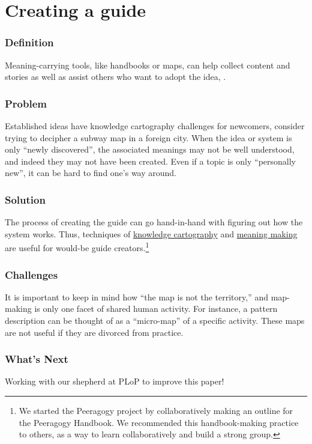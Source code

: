 \section{Creating a guide}\label{sec:Creating_a_guide}
\subsubsection*{Definition} Meaning-carrying tools, like handbooks or maps, can help collect content and stories as well as assist others who want to adopt the idea, .

\subsubsection*{Problem} 
Established ideas have knowledge cartography challenges for newcomers, consider trying to decipher a subway map in a foreign city. When the idea or system is only ``newly discovered'', the associated meanings may not be well understood, and indeed they may not have been created. Even if a topic is only ``personally new'', it can be hard to find one's way around.

\subsubsection*{Solution}
The process of creating the guide can go hand-in-hand with figuring out how the system works. Thus, techniques of \href{http://knowledgecartography.org/}{knowledge cartography} and \href{http://www.hitl.washington.edu/publications/r-97-47/two.html}{meaning making} are useful for would-be guide creators.\footnote{We started the Peeragogy project by collaboratively making an outline for the Peeragogy Handbook. We recommended this
handbook-making practice to others, as a way to learn collaboratively and build a strong group.}

\subsubsection*{Challenges} 
It is important to keep in mind how ``the map is not the territory,'' and map-making is only one facet of shared human activity. For instance, a pattern description can be thought of as a ``micro-map'' of a specific activity. These maps are not useful if they are divorced from practice.

\subsubsection*{What's Next} 
Working with our shepherd at PLoP to improve this paper!


